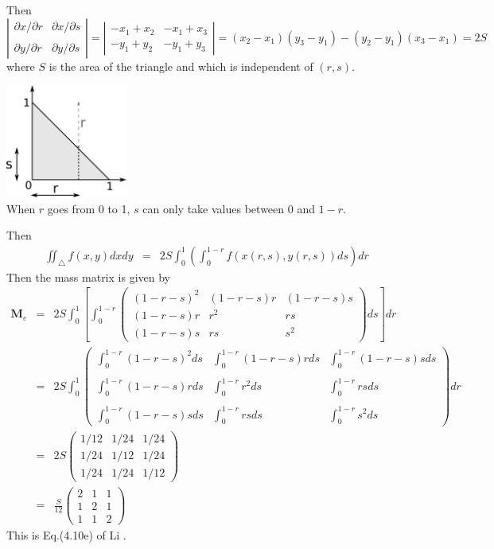 Then 
\[
\left| 
\begin{array}{cc}
\partial x/\partial r & \partial x/\partial s \\ \\
\partial y/\partial r & \partial y/\partial s 
\end{array}
\right|  
=
\left| 
\begin{array}{cc}
- x_1+ x_2 & - x_1+ x_3 \\
- y_1+ y_2 & - y_1+ y_3 
\end{array}
\right|  
=
(x_2-x_1)(y_3-y_1)-(y_2-y_1)(x_3-x_1)
= 2S
\]
where $S$ is the area of the triangle and which is independent of $(r,s)$.
\begin{center}
\includegraphics[width=4cm]{images/elemental_mat/triangle} \\
{\captionfont When $r$ goes from 0 to 1, $s$ can only take values between 0 and $1-r$.}
\end{center}

Then 
\begin{eqnarray}
\iint_\triangle f(x,y) dx dy &=& 2S \int_0^{1} \left(\int_0^{1-r} f(x(r,s),y(r,s))  ds \right) dr 
\end{eqnarray}
Then the mass matrix is given by
\begin{eqnarray}
{\bm M}_e 
&=& 2S \int_{0}^1 \left[ \int_{0}^{1-r}
\left(
\begin{array}{ccc}
(1-r-s)^2 & (1-r-s)r & (1-r-s)s \\
(1-r-s)r & r^2 & rs \\
(1-r-s)s & rs & s^2 
\end{array}
\right)
 ds \right] dr \\
&=& 
2S \int_{0}^1 
\left(
\begin{array}{ccc}
\int_0^{1-r} (1-r-s)^2 ds &\int_0^{1-r} (1-r-s)r ds& \int_0^{1-r} (1-r-s)s ds \\ \\
\int_0^{1-r} (1-r-s)r ds  &\int_0^{1-r} r^2 ds     & \int_0^{1-r} rs ds \\ \\
\int_0^{1-r} (1-r-s)s ds  &\int_0^{1-r} rs ds      & \int_0^{1-r} s^2 ds
\end{array}
\right)
 dr \\
&=& 
2S
\left(
\begin{array}{ccc}
1/12 & 1/24 & 1/24 \\
1/24 & 1/12 & 1/24 \\
1/24 & 1/24 & 1/12
\end{array}
\right)
\\
&=&
\frac{S}{12}
\left(
\begin{array}{ccc}
2 & 1 & 1 \\
1 & 2 & 1 \\
1 & 1 & 2
\end{array}
\right)
\end{eqnarray}
This is Eq.(4.10e) of Li \cite{li06}.


